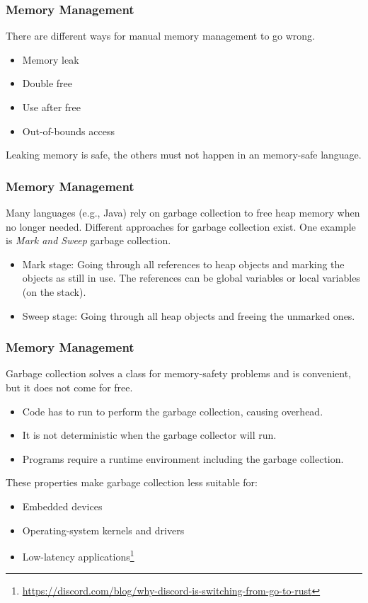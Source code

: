 \begin{frame}[fragile]
    \frametitle{Memory Management}
    There are different ways for manual memory management to go wrong.
    \pause
    \vfill
    \begin{itemize}
        \item Memory leak
        \item Double free
        \pause
        \item Use after free
        \item Out-of-bounds access
    \end{itemize}
    \pause
    \vfill
    Leaking memory is safe, the others must not happen in an memory-safe language.
\end{frame}

\begin{frame}[fragile]
    \frametitle{Memory Management}
    Many languages (e.g., Java) rely on garbage collection to free heap memory when no longer needed.
    \pause
    \vfill
    Different approaches for garbage collection exist.
    One example is \textit{Mark and Sweep} garbage collection.
    \begin{itemize}
        \item Mark stage: Going through all references to heap objects and marking the objects as still in use. The references can be global variables or local variables (on the stack).
        \item Sweep stage: Going through all heap objects and freeing the unmarked ones.
    \end{itemize}
\end{frame}

\begin{frame}[fragile]
    \frametitle{Memory Management}
    Garbage collection solves a class for memory-safety problems and is convenient, but it does not come for free.
    \pause
    \vfill
    \begin{itemize}
        \item Code has to run to perform the garbage collection, causing overhead.
        \item It is not deterministic when the garbage collector will run.
        \item Programs require a runtime environment including the garbage collection.
    \end{itemize}
    \pause
    \vfill
    These properties make garbage collection less suitable for:
    \begin{itemize}
        \item Embedded devices
        \item Operating-system kernels and drivers
        \item Low-latency applications\footnote{\url{https://discord.com/blog/why-discord-is-switching-from-go-to-rust}}
    \end{itemize}
\end{frame}


